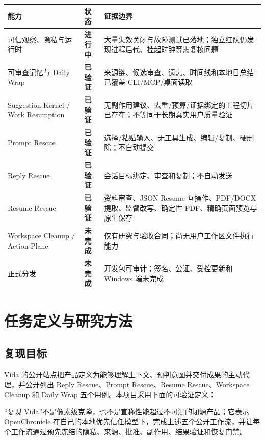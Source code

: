 \documentclass[UTF8,fontset=none,zihao=-4,openany]{ctexrep}
\newcommand{\good}{\textcolor{OCGreen}{\bfseries 已验证}}
\newcommand{\inprogress}{\textcolor{OCOrange}{\bfseries 进行中}}
\newcommand{\openitem}{\textcolor{OCRed}{\bfseries 未完成}}
\begin{document}
\begin{center}
\begin{tabularx}{\textwidth}{p{37mm}C{24mm}Y}
\toprule
能力 & 状态 & 证据边界 \\
\midrule
可信观察、隐私与运行时 & \inprogress & 大量失效关闭与故障测试已落地；独立红队仍发现进程后代、挂起时钟等需复核问题 \\
可审查记忆与 Daily Wrap & \good & 来源链、候选审查、遗忘、时间线和本地日总结已覆盖 CLI/MCP/桌面读取 \\
Suggestion Kernel / Work Resumption & \good & 无副作用建议、去重/预算/证据绑定的工程切片已存在；不等同于长期真实用户质量验证 \\
Prompt Rescue & \good & 选择/粘贴输入、无工具生成、编辑/复制、硬删除；不自动提交 \\
Reply Rescue & \good & 会话目标绑定、审查和复制；不自动发送 \\
Resume Rescue & \good & 资料审查、JSON Resume 互操作、PDF/DOCX 提取、监督改写、确定性 PDF、精确页面预览与原生保存 \\
Workspace Cleanup / Action Plane & \openitem & 仅有研究与验收合同；尚无用户工作区文件执行能力 \\
正式分发 & \openitem & 开发包可审计；签名、公证、受控更新和 Windows 端未完成 \\
\bottomrule
\end{tabularx}
\end{center}

\tableofcontents
\clearpage
{}

\chapter{任务定义与研究方法}

\section{复现目标}

Vida 的公开站点把产品定义为能够理解上下文、预判意图并交付成果的主动代理，并公开列出 Reply Rescue、Prompt Rescue、Resume Rescue、Workspace Cleanup 和 Daily Wrap 五个用例\cite{vida-home}。本项目采用下面的可验证定义：

\begin{decisionbox}
“复现 Vida”不是像素级克隆，也不是宣称性能超过不可测的闭源产品；它表示 OpenChronicle 在自己的本地优先信任模型下，完成上述五个公开工作流，并让每个工作流通过预先冻结的隐私、来源、批准、副作用、结果验证和恢复门禁。
\end{decisionbox}
\end{document}
